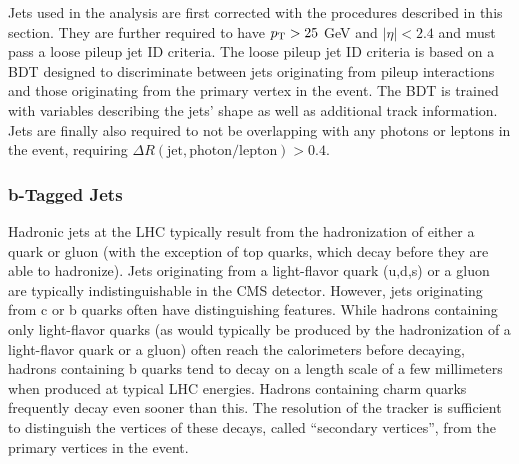Jets used in the \ttH analysis are first corrected with the procedures described in this section.
They are further required to have $p_{\mathrm{T}} > 25$ GeV and $|\eta| < 2.4$ and must pass a loose pileup jet ID criteria.
The loose pileup jet ID criteria is based on a BDT designed to discriminate between jets originating from pileup interactions and those originating from the primary vertex in the event.
The BDT is trained with variables describing the jets' shape as well as additional track information.
Jets are finally also required to not be overlapping with any photons or leptons in the event, requiring $\Delta R(\text{jet}, \text{photon/lepton}) > 0.4$.

\subsubsection*{b-Tagged Jets}
Hadronic jets at the LHC typically result from the hadronization of either a quark or gluon (with the exception of top quarks, which decay before they are able to hadronize).
Jets originating from a light-flavor quark (u,d,s) or a gluon are typically indistinguishable in the CMS detector.
However, jets originating from c or b quarks often have distinguishing features. 
While hadrons containing only light-flavor quarks (as would typically be produced by the hadronization of a light-flavor quark or a gluon) often reach the calorimeters before decaying, hadrons containing b quarks tend to decay on a length scale of a few millimeters when produced at typical LHC energies.
Hadrons containing charm quarks frequently decay even sooner than this.
The resolution of the tracker is sufficient to distinguish the vertices of these decays, called ``secondary vertices'', from the primary vertices in the event.

